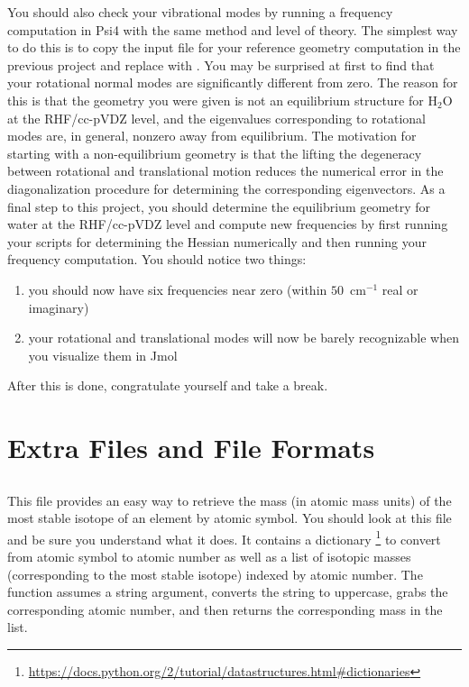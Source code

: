 \documentclass[11pt]{article}
\begin{document}
You should also check your vibrational modes by running a frequency computation
in Psi4 with the same method and level of theory. The simplest way to do this
is to copy the input file for your reference geometry computation in the
previous project and replace  with .
You may be surprised at first to find that your rotational normal modes are
significantly different from zero. The reason for this is that the geometry you
were given is not an equilibrium structure for H$_2$O at the RHF/cc-pVDZ level,
and the eigenvalues corresponding to rotational modes are, in general, nonzero
away from equilibrium. The motivation for starting with a non-equilibrium
geometry is that the lifting the degeneracy between rotational and
translational motion reduces the numerical error in the diagonalization
procedure for determining the corresponding eigenvectors. As a final step to
this project, you should determine the equilibrium geometry for water at the
RHF/cc-pVDZ level and compute new frequencies by first running your scripts for
determining the Hessian numerically and then running your frequency
computation. You should notice two things:
\begin{enumerate}
    \item you should now have six frequencies near zero (within $50$~cm$^{-1}$
real or imaginary)
    \item your rotational and translational modes will now be barely
recognizable when you visualize them in Jmol
\end{enumerate}
After this is done, congratulate yourself and take a break.


\newpage
\section{Extra Files and File Formats}
\subsection{}
This file provides an easy way to retrieve the mass (in atomic mass units) of
the most stable isotope of an element by atomic symbol. You should look at this
file and be sure you understand what it does. It contains a dictionary
\footnote{\url{https://docs.python.org/2/tutorial/datastructures.html\#dictionaries}}
to convert from atomic symbol to atomic number as well as a list of isotopic
masses (corresponding to the most stable isotope) indexed by atomic number. The
 function assumes a string argument, converts the string to
uppercase, grabs the corresponding atomic number, and then returns the
corresponding mass in the list.
\end{document}

